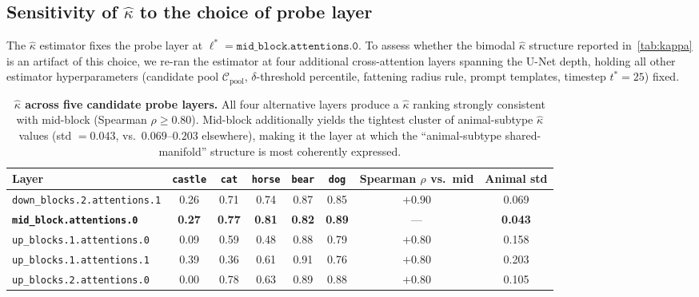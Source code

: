  

\subsection{Sensitivity of $\hat\kappa$ to the choice of probe layer}
\label{app:layer_sensitivity}

The $\hat\kappa$ estimator fixes the probe layer at $\ell^* = \texttt{mid\_block.attentions.0}$. To assess whether the bimodal $\hat\kappa$ structure reported in~\cref{tab:kappa} is an artifact of this choice, we re-ran the estimator at four additional cross-attention layers spanning the U-Net depth, holding all other estimator hyperparameters (candidate pool $\mathcal{C}_{\text{pool}}$, $\delta$-threshold percentile, fattening radius rule, prompt templates, timestep $t^*=25$) fixed.

\begin{table}[ht]
\centering
\small
\setlength{\tabcolsep}{2pt}
\begin{tabular}{lccccc|cc}
\toprule
\textbf{Layer} & \texttt{castle} & \texttt{cat} & \texttt{horse} & \texttt{bear} & \texttt{dog} & Spearman $\rho$ vs.\ mid & Animal std \\
\midrule
\texttt{down\_blocks.2.attentions.1} & 0.26 & 0.71 & 0.74 & 0.87 & 0.85 & $+0.90$ & 0.069 \\
\textbf{\texttt{mid\_block.attentions.0}} & \textbf{0.27} & \textbf{0.77} & \textbf{0.81} & \textbf{0.82} & \textbf{0.89} & --- & \textbf{0.043} \\
\texttt{up\_blocks.1.attentions.0} & 0.09 & 0.59 & 0.48 & 0.88 & 0.79 & $+0.80$ & 0.158 \\
\texttt{up\_blocks.1.attentions.1} & 0.39 & 0.36 & 0.61 & 0.91 & 0.76 & $+0.80$ & 0.203 \\
\texttt{up\_blocks.2.attentions.0} & 0.00 & 0.78 & 0.63 & 0.89 & 0.88 & $+0.80$ & 0.105 \\
\bottomrule
\end{tabular}
\caption{\textbf{$\hat\kappa$ across five candidate probe layers.} All four alternative layers produce a $\hat\kappa$ ranking strongly consistent with mid-block (Spearman $\rho \geq 0.80$). Mid-block additionally yields the tightest cluster of animal-subtype $\hat\kappa$ values (std $=0.043$, vs.\ $0.069$--$0.203$ elsewhere), making it the layer at which the ``animal-subtype shared-manifold'' structure is most coherently expressed.}
\label{tab:layer_sensitivity}
\end{table}

